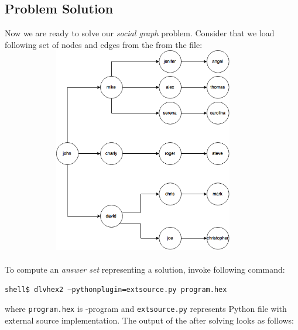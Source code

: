 \documentclass[14pt,a4paper, titlepage]{article}
\begin{document}
\subsection{Problem Solution}
Now we are ready to solve our \emph{social graph} problem. Consider that we load following set of nodes and edges from the from the file:\\
\includegraphics[width=12.5cm,height=9cm]{graph}
\\ \\To compute an \emph{answer set} representing 
a solution, invoke following command:
\\ \centerline{\texttt{shell\$ dlvhex2 --pythonplugin=extsource.py program.hex}}
where \texttt{program.hex} is \hex-program and \texttt{extsource.py} represents Python file with 
external source implementation. The output of the \dlvhex{} after solving looks as follows:
\end{document}
